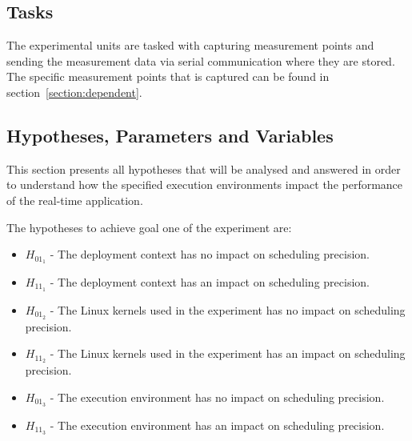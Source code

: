 \subsection{Tasks}

The experimental units are tasked with capturing measurement points and sending the measurement data via serial communication where they are stored. The specific measurement points that is captured can be found in section~\ref{section:dependent}.



\subsection{Hypotheses, Parameters and Variables}
This section presents all hypotheses that will be analysed and answered in order to understand how the specified execution environments impact the performance of the real-time application.\\


The hypotheses to achieve goal one of the experiment are:
\begin{itemize}
\item $H_{01_{1}}$ - The deployment context has no impact on scheduling precision.
\item $H_{11_{1}}$ - The deployment context has an impact on scheduling precision.
\item $H_{01_{2}}$ - The Linux kernels used in the experiment has no impact on scheduling precision.
\item $H_{11_{2}}$ - The Linux kernels used in the experiment has an impact on scheduling precision.
\item $H_{01_{3}}$ - The execution environment has no impact on scheduling precision.
\item $H_{11_{3}}$ - The execution environment has an impact on scheduling precision.\\
\end{itemize}


